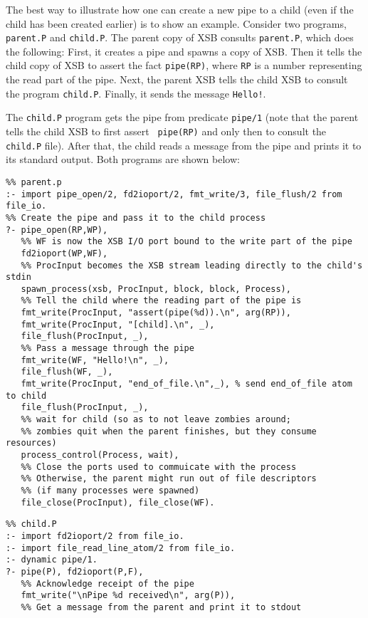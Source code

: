 \begin{description}
    The best way to illustrate how one can create a new pipe to a child
    (even if the child has been created earlier) is to show an example.
    Consider two programs, {\tt parent.P} and {\tt child.P}. The parent
    copy of XSB consults {\tt parent.P}, which does the following: First, it
    creates a pipe and spawns a copy of XSB. Then it tells the
    child copy of XSB to assert the fact {\tt pipe(RP)}, where {\tt RP} is
    a number representing the read part of the pipe. Next, the parent XSB tells
    the child XSB to consult the program {\tt child.P}. Finally, it sends
    the message {\tt Hello!}.

    The {\tt child.P} program gets the pipe from predicate {\tt pipe/1}
    (note that the parent tells the child XSB to first assert {\tt
    pipe(RP)} and only then to consult the {\tt child.P} file).
  After that, the child reads a message from the pipe and prints it to its
    standard output. Both programs are shown below:
    \begin{verbatim}
%% parent.p      
:- import pipe_open/2, fd2ioport/2, fmt_write/3, file_flush/2 from file_io.
%% Create the pipe and pass it to the child process
?- pipe_open(RP,WP),
   %% WF is now the XSB I/O port bound to the write part of the pipe
   fd2ioport(WP,WF),
   %% ProcInput becomes the XSB stream leading directly to the child's stdin
   spawn_process(xsb, ProcInput, block, block, Process),
   %% Tell the child where the reading part of the pipe is
   fmt_write(ProcInput, "assert(pipe(%d)).\n", arg(RP)),
   fmt_write(ProcInput, "[child].\n", _),
   file_flush(ProcInput, _),
   %% Pass a message through the pipe
   fmt_write(WF, "Hello!\n", _),
   file_flush(WF, _),
   fmt_write(ProcInput, "end_of_file.\n",_), % send end_of_file atom to child
   file_flush(ProcInput, _),
   %% wait for child (so as to not leave zombies around; 
   %% zombies quit when the parent finishes, but they consume resources)
   process_control(Process, wait),
   %% Close the ports used to commuicate with the process
   %% Otherwise, the parent might run out of file descriptors 
   %% (if many processes were spawned)
   file_close(ProcInput), file_close(WF).
    \end{verbatim}
    \begin{verbatim}
%% child.P
:- import fd2ioport/2 from file_io.
:- import file_read_line_atom/2 from file_io.
:- dynamic pipe/1.
?- pipe(P), fd2ioport(P,F),
   %% Acknowledge receipt of the pipe
   fmt_write("\nPipe %d received\n", arg(P)),
   %% Get a message from the parent and print it to stdout

\end{verbatim}
\end{description}
